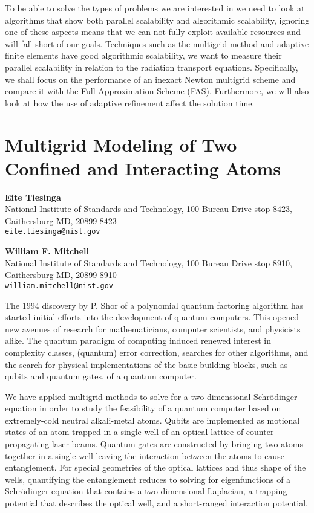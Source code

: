 \documentclass[11pt]{article}
\newcommand{\nextab}[4]{
	\section{#2}
	{\bf #1} \\ \nopagebreak
	{#3} \\ \nopagebreak
	{\tt #4} \nopagebreak
	}
\begin{document}
To be able to solve the types of problems we are
interested in we need to look at algorithms that show both parallel
scalability and algorithmic scalability, ignoring one of these aspects
means that we can not fully exploit available resources and will fall
short of our goals. Techniques such as the multigrid method and adaptive
finite elements have good algorithmic scalability, we want to measure
their parallel scalability in relation to the radiation transport
equations. Specifically, we shall focus on the performance of an inexact
Newton multigrid scheme and compare it with the Full Approximation Scheme
(FAS). Furthermore, we will also look at how the use of adaptive
refinement affect the solution time.




\nextab
{Eite Tiesinga}
{Multigrid Modeling of Two Confined and Interacting Atoms}
{National Institute of Standards and Technology, 100 Bureau Drive stop 8423, Gaithersburg MD, 20899-8423}
{eite.tiesinga@nist.gov}

{\bf William F. Mitchell} \\
National Institute of Standards and Technology,
100 Bureau Drive stop 8910,
Gaithersburg MD, 20899-8910
\\ {\tt william.mitchell@nist.gov}


The 1994 discovery by P. Shor of a polynomial quantum factoring
algorithm has started initial efforts into the development of quantum
computers.  This opened new avenues of research for mathematicians,
computer scientists, and physicists alike.  The quantum paradigm of
computing induced renewed interest in complexity classes, (quantum)
error correction, searches for other algorithms, and the search for
physical implementations of the basic building blocks,
such as qubits and quantum gates, of a quantum computer.


We have applied multigrid methods to solve for a two-dimensional
Schr\"odinger equation in order to study the feasibility of a quantum
computer based on extremely-cold neutral alkali-metal atoms.  Qubits are
implemented as motional states of an atom trapped in a single well of
an optical lattice of counter-propagating laser beams.  Quantum gates
are constructed by bringing two atoms together in a single well leaving
the interaction between the atoms to cause entanglement.  For special
geometries of the optical lattices and thus shape of the wells, quantifying
the entanglement reduces to solving for eigenfunctions of a Schr\"odinger
equation that contains a two-dimensional Laplacian, a trapping potential
that describes the optical well, and a short-ranged interaction potential.
\end{document}
